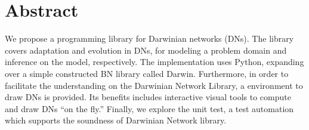 %
\chapter*{Abstract}
\label{sec:abstract}
\vspace*{-10mm}

We propose a programming library for Darwinian networks (DNs).
The library covers adaptation and evolution in DNs, for modeling a problem domain and inference on the model, respectively.
The implementation uses Python, expanding over a simple constructed BN library called Darwin.
Furthermore, in order to facilitate the understanding on the Darwinian Network Library, a environment to draw DNs is provided.
Its benefits includes interactive visual tools to compute and draw DNs ``on the fly.''
Finally, we explore the unit test, a test automation which supports the soundness of Darwinian Network library.
